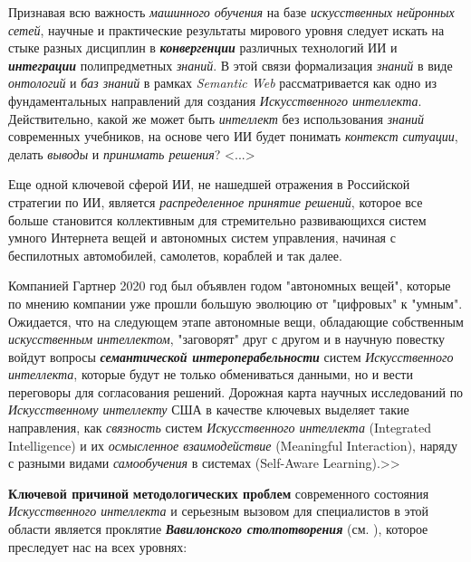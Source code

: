Признавая всю важность \textit{машинного обучения} на базе \textit{искусственных} \textit{нейронных сетей}, научные и практические результаты мирового уровня следует искать на стыке разных дисциплин в \textbf{\textit{конвергенции}} различных технологий ИИ и \textbf{\textit{интеграции}} полипредметных \textit{знаний}. В этой связи формализация \textit{знаний} в виде \textit{онтологий} и \textit{баз знаний} в рамках \textit{Semantic Web} рассматривается как одно из фундаментальных направлений для создания \textit{Искусственного интеллекта}. Действительно, какой же может быть \textit{интеллект} без использования \textit{знаний} современных учебников, на основе чего ИИ будет понимать \textit{контекст ситуации}, делать \textit{выводы} и \textit{принимать решения}? <...>

Еще одной ключевой сферой ИИ, не нашедшей отражения в Российской стратегии по ИИ, является \textit{распределенное принятие решений}, которое все больше становится коллективным для стремительно развивающихся систем умного Интернета вещей и автономных систем управления, начиная с беспилотных автомобилей, самолетов, кораблей и так далее.

Компанией Гартнер 2020 год был объявлен годом "автономных вещей"{}, которые по мнению компании уже прошли большую эволюцию от "цифровых"{} к "умным"{}. Ожидается, что на следующем этапе автономные вещи, обладающие собственным \textit{искусственным интеллектом}, "заговорят"{} друг с другом и в научную повестку войдут вопросы \textbf{\textit{семантической интероперабельности}} систем \textit{Искусственного интеллекта}, которые будут не только обмениваться данными, но и вести переговоры для согласования решений. Дорожная карта научных исследований по \textit{Искусственному интеллекту} США в качестве ключевых выделяет такие направления, как \textit{связность} систем \textit{Искусственного интеллекта} (Integrated Intelligence) и их \textit{осмысленное взаимодействие} (Meaningful Interaction), наряду с разными видами \textit{самообучения} в системах (Self-Aware Learning).>>
\begin{SCn}
\end{SCn}

\textbf{Ключевой причиной} \textbf{методологических проблем} современного состояния \textit{Искусственного интеллекта} и серьезным вызовом для специалистов в этой области является проклятие \textbf{\textit{Вавилонского столпотворения}} (см. ), которое преследует нас на всех уровнях:

